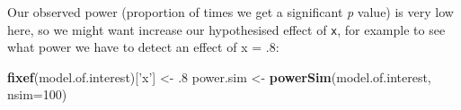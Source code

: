\documentclass[]{article}
\newenvironment{Shaded}{\begin{snugshade}}{\end{snugshade}}
\newcommand{\KeywordTok}[1]{\textcolor[rgb]{0.13,0.29,0.53}{\textbf{#1}}}
\newcommand{\DataTypeTok}[1]{\textcolor[rgb]{0.13,0.29,0.53}{#1}}
\newcommand{\DecValTok}[1]{\textcolor[rgb]{0.00,0.00,0.81}{#1}}
\newcommand{\StringTok}[1]{\textcolor[rgb]{0.31,0.60,0.02}{#1}}
\newcommand{\NormalTok}[1]{#1}
\theoremstyle{definition}
\theoremstyle{definition}
\theoremstyle{definition}
\theoremstyle{remark}
\begin{document}
\begin{Shaded}
\end{Shaded}

Our observed power (proportion of times we get a significant \emph{p}
value) is very low here, so we might want increase our hypothesised
effect of \texttt{x}, for example to see what power we have to detect an
effect of x = .8:

\begin{Shaded}
\begin{Highlighting}[]
\KeywordTok{fixef}\NormalTok{(model.of.interest)[}\StringTok{'x'}\NormalTok{] <-}\StringTok{ }\NormalTok{.}\DecValTok{8}
\NormalTok{power.sim <-}\StringTok{ }\KeywordTok{powerSim}\NormalTok{(model.of.interest, }\DataTypeTok{nsim=}\DecValTok{100}\NormalTok{)}

\end{Highlighting}
\end{Shaded}
\end{document}
